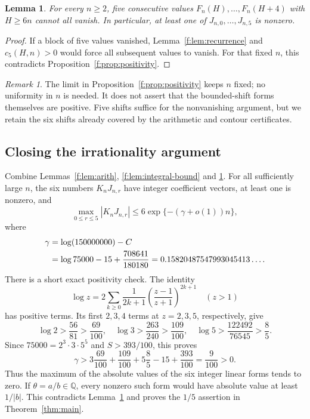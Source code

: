 \documentclass[11pt]{amsart}
\newcommand{\Q}{\mathbb Q}
\theoremstyle{plain}
\newtheorem{lemma}[theorem]{Lemma}
\theoremstyle{remark}\newtheorem{remark}[theorem]{Remark}
\numberwithin{equation}{section}
\begin{document}
\begin{lemma}\label{f:lem:nonzero}
For every $n\ge2$, five consecutive values
$F_n(H),\ldots,F_n(H+4)$ with $H\ge6n$ cannot all vanish.
In particular, at least one of $J_{n,0},\ldots,J_{n,5}$ is nonzero.
\end{lemma}
\begin{proof}
If a block of five values vanished, Lemma~\ref{f:lem:recurrence} and
$c_5(H,n)>0$ would force all subsequent values to vanish.
For that fixed $n$, this contradicts Proposition~\ref{f:prop:positivity}.
\end{proof}

\begin{remark}
The limit in Proposition~\ref{f:prop:positivity} keeps $n$ fixed;
no uniformity in $n$ is needed. It does not assert that the bounded-shift
forms themselves are positive. Five shifts suffice for the
nonvanishing argument, but we retain the six shifts already covered by
the arithmetic and contour certificates.
\end{remark}

\subsection{Closing the irrationality argument}\label{f:sec:conclusion}
Combine Lemmas~\ref{f:lem:arith}, \ref{f:lem:integral-bound} and \ref{f:lem:nonzero}. For all sufficiently large $n$, the six numbers $K_nJ_{n,r}$ have integer coefficient vectors, at least one is nonzero, and
\[
 \max_{0\leq r\leq5}|K_nJ_{n,r}|
 \leq6\exp\{-(\gamma+o(1))n\},
\]
where
\begin{align}\label{f:eq:gap}
 \gamma&=\log(150000000)-C\\
 &=\log75000-15+\frac{708641}{180180}
 =0.15820487547993045413\ldots.\notag
\end{align}
There is a short exact positivity check. The identity
\[
 \log z=2\sum_{k\geq0}\frac{1}{2k+1}\left(\frac{z-1}{z+1}\right)^{2k+1}
 \quad(z>1)
\]
has positive terms. Its first $2,3,4$ terms at $z=2,3,5$, respectively, give
\[
 \log2>\frac{56}{81}>\frac{69}{100},\quad
 \log3>\frac{263}{240}>\frac{109}{100},\quad
 \log5>\frac{122492}{76545}>\frac85.
\]
Since $75000=2^3\cdot3\cdot5^5$ and $S>393/100$, this proves
\[
 \gamma>3\frac{69}{100}+\frac{109}{100}+5\frac85-15+\frac{393}{100}
 =\frac9{100}>0.
\]
Thus the maximum of the absolute values of the six integer linear forms tends to zero. If $\theta=a/b\in\Q$, every nonzero such form would have absolute value at least $1/|b|$. This contradicts Lemma~\ref{f:lem:nonzero} and proves the $1/5$ assertion in Theorem~\ref{thm:main}.
\end{document}
